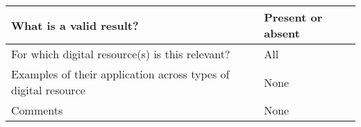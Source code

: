 \documentclass[english]{article}
\begin{document}
\begin{longtable}{|p{5cm}|p{9cm}|}
\hline
What is a valid result? &  


Present or absent


\\



\hline
For which digital resource(s) is this relevant? &  All\\



\hline
Examples of their application across types of digital resource &  

None


\\



\hline

Comments & 


None

 \\ 
\hline

\end{longtable}


\newpage
\end{document}
